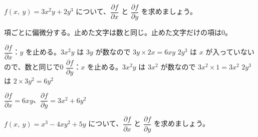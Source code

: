 \begin{reidai}[多項式の偏微分]
$f(x,\ y)=3x^2y+2y^3$ について、$\dfrac{\partial f}{\partial x}$ と $\dfrac{\partial f}{\partial y}$ を求めましょう。\par
\kangaekata 項ごとに偏微分する。止めた文字は数と同じ。止めた文字だけの項は0。\par
\shiki $\dfrac{\partial f}{\partial x}$：$y$ を止める。$3x^2y$ は $3y$ が数なので $3y\times2x=6xy$\kviiicq
$2y^3$ は $x$ が入っていないので、数と同じで0\kviiicq
$\dfrac{\partial f}{\partial y}$：$x$ を止める。$3x^2y$ は $3x^2$ が数なので $3x^2\times1=3x^2$\kviiicq
$2y^3$ は $2\times3y^2=6y^2$\par
\kotae $\dfrac{\partial f}{\partial x}=6xy$、$\dfrac{\partial f}{\partial y}=3x^2+6y^2$
\end{reidai}

\begin{jibun}
$f(x,\ y)=x^3-4xy^2+5y$ について、$\dfrac{\partial f}{\partial x}$ と $\dfrac{\partial f}{\partial y}$ を求めましょう。
\end{jibun}

